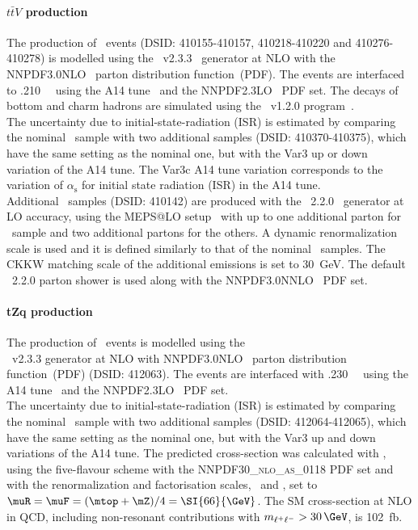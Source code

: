 \paragraph{$t\bar{t}V$ production} 
The production of \ttV\ events (DSID\@: 410155-410157, 410218-410220
and 410276-410278) is modelled using the
\mgamc~v2.3.3~\cite{Alwall:2014hca} generator at NLO with the
NNPDF3.0NLO~\cite{Ball:2014uwa} parton distribution function~(PDF).
The events are interfaced to \pythia.210~\cite{Sjostrand:2014zea}~
using the A14 tune~\cite{ATL-PHYS-PUB-2014-021} and the
NNPDF2.3LO~\cite{Ball:2014uwa} PDF set. The decays of bottom and charm
hadrons are simulated using the \evtgen\ v1.2.0 program~\cite{EvtGen}.\\
The uncertainty due to initial-state-radiation (ISR) is estimated by
comparing the nominal \ttV\ sample with two additional samples (DSID\@: 410370-410375), which
have the same setting as the nominal one, but with the Var3 up or down
variation of the A14 tune.  The Var3c A14 tune variation corresponds
to the variation of $\alpha_{\textrm{s}}$ for initial state radiation
(ISR) in the A14 tune.\\
Additional \ttV\ samples (DSID\@: 410142) are produced with the
\sherpa~2.2.0~\cite{Bothmann:2019yzt} generator at LO accuracy, using
the MEPS@LO setup~\cite{Catani:2001cc,Hoeche:2009rj} with up to one
additional parton for \ttll\ sample and two additional partons for the
others. A dynamic renormalization scale is used and it is defined
similarly to that of the nominal \ttV\ samples. The CKKW matching
scale of the additional emissions is set to 30~GeV. The default
\sherpa~2.2.0 parton shower is used along with the
NNPDF3.0NNLO~\cite{Ball:2014uwa} PDF set.

\paragraph{tZq production}
The production of \tZq\ events is modelled using the\\ \mgamc~v2.3.3 \cite{Alwall:2014hca}
generator at NLO with NNPDF3.0NLO~\cite{Ball:2014uwa} parton distribution function~(PDF) (DSID\@: 412063).
The events are interfaced with \pythia.230~\cite{Sjostrand:2014zea}~ using the A14 tune~\cite{ATL-PHYS-PUB-2014-021} and the NNPDF2.3LO~\cite{Ball:2014uwa} PDF set.\\
The uncertainty due to initial-state-radiation (ISR) is estimated by comparing the nominal \tZq\ sample with two additional samples (DSID\@: 412064-412065),
which have the same setting as the nominal one, but with the Var3 up and down variations of the A14 tune. 
The predicted cross-section was calculated with , using the five-flavour scheme with the \textsc{NNPDF30\_nlo\_as\_0118} PDF set and with the renormalization and factorisation scales, \muR\ and \muF, set to \\ \mbox{$\muR = \muF = (\mtop + \mZ)/4 = \SI{66}{\GeV}$.} The SM \tZq cross-section at NLO in QCD, including non-resonant contributions with $m_{\ell^+\ell^-} > 30\,\GeV$, is \SI{102}{fb}.

